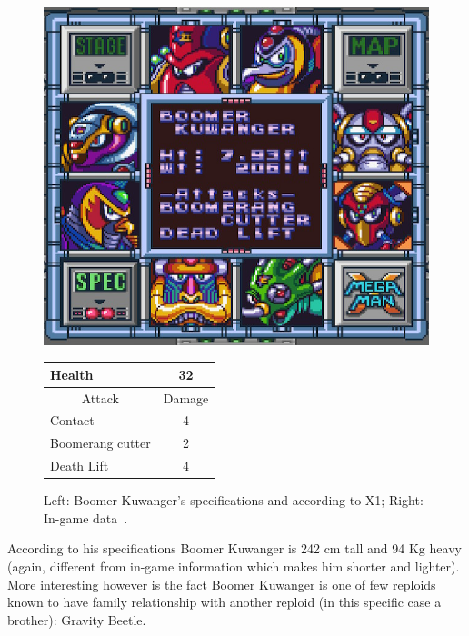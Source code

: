 \begin{figure}[htp]
	\begin{minipage}[c]{0.45\linewidth}
		\vspace{0pt}
		\centering
		\includegraphics[width=\linewidth]{figures/X1/Boomer_kuwanger/Boomer_kuwanger_specs.png}
	\end{minipage}
	\begin{minipage}[c]{0.45\linewidth}
		\centering
		\vspace{0pt}
		\begin{tabular}[h]{l c}
			\toprule
			Health  & 32\\
			\midrule
			\multicolumn{1}{c}{Attack} & \multicolumn{1}{c}{Damage}\\
			Contact & 4\\
			Boomerang cutter& 2\\
			Death Lift & 4\\
			\bottomrule
		\end{tabular}
	\end{minipage}
	\caption{Left: Boomer Kuwanger's specifications and according to X1; Right: In-game data~\cite{wiki:Boomer_kuwanger}. }
	\label{Kuwanger_specs}
\end{figure}

According to his specifications Boomer Kuwanger is 242 cm tall and 94 Kg heavy (again, different from in-game information which makes him shorter and lighter). More interesting however is the fact Boomer Kuwanger is one of few reploids known to have family relationship with another reploid (in this specific case a brother): Gravity Beetle.%

